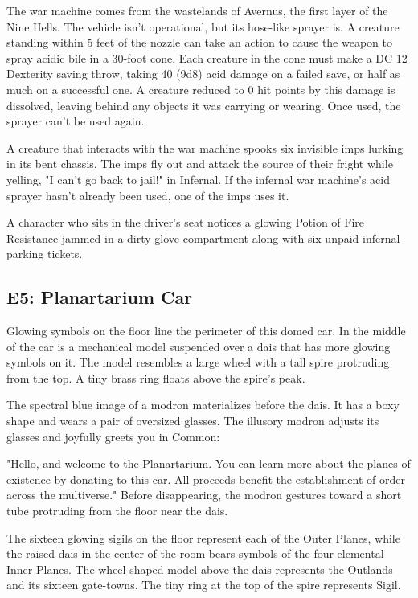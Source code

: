 \documentclass[10pt,a4paper,twoside,bg=print,twocolumn,openany,nodeprecatedcode]{dndbook}
\begin{document}
The war machine comes from the wastelands of Avernus, the first layer of the Nine Hells. The vehicle isn't operational, but its hose-like sprayer is. A creature standing within 5 feet of the nozzle can take an action to cause the weapon to spray acidic bile in a 30-foot cone. Each creature in the cone must make a DC 12 Dexterity saving throw, taking 40 (9d8) acid damage on a failed save, or half as much on a successful one. A creature reduced to 0 hit points by this damage is dissolved, leaving behind any objects it was carrying or wearing. Once used, the sprayer can't be used again.

A creature that interacts with the war machine spooks six invisible imps lurking in its bent chassis. The imps fly out and attack the source of their fright while yelling, "I can't go back to jail!" in Infernal. If the infernal war machine's acid sprayer hasn't already been used, one of the imps uses it.

A character who sits in the driver's seat notices a glowing Potion of Fire Resistance jammed in a dirty glove compartment along with six unpaid infernal parking tickets.

\subsection{E5: Planartarium Car}
\begin{DndReadAloud}{}
Glowing symbols on the floor line the perimeter of this domed car. In the middle of the car is a mechanical model suspended over a dais that has more glowing symbols on it. The model resembles a large wheel with a tall spire protruding from the top. A tiny brass ring floats above the spire's peak.

The spectral blue image of a modron materializes before the dais. It has a boxy shape and wears a pair of oversized glasses. The illusory modron adjusts its glasses and joyfully greets you in Common:

"Hello, and welcome to the Planartarium. You can learn more about the planes of existence by donating to this car. All proceeds benefit the establishment of order across the multiverse." Before disappearing, the modron gestures toward a short tube protruding from the floor near the dais.

\end{DndReadAloud}

The sixteen glowing sigils on the floor represent each of the Outer Planes, while the raised dais in the center of the room bears symbols of the four elemental Inner Planes. The wheel-shaped model above the dais represents the Outlands and its sixteen gate-towns. The tiny ring at the top of the spire represents Sigil.
\end{document}
